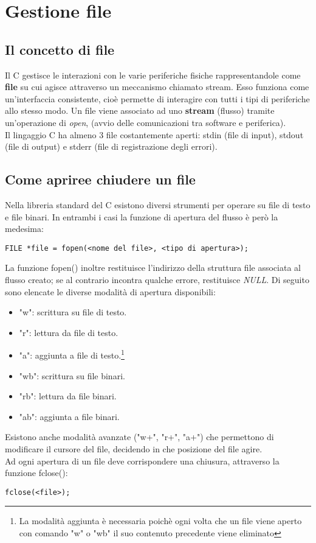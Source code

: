 \chapter{Gestione file}
\section{Il concetto di file}
Il C gestisce le interazioni con le varie periferiche fisiche rappresentandole come \textbf{file} su cui agisce attraverso un meccanismo chiamato stream. Esso funziona come un'interfaccia consistente, cioè permette di interagire con tutti i tipi di periferiche allo stesso modo. Un file viene associato ad uno \textbf{stream} (flusso) tramite un'operazione di \textit{open}, (avvio delle comunicazioni tra software e periferica).\\
Il lingaggio C ha almeno 3 file costantemente aperti: \colorbox{light-gray}{stdin} (file di input), \colorbox{light-gray}{stdout} (file di output) e \colorbox{light-gray}{stderr} (file di registrazione degli errori).

\section{Come apriree chiudere un file}
Nella libreria standard del C esistono diversi strumenti per operare su file di testo e file binari. In entrambi i casi la funzione di apertura del flusso è però la medesima:
\begin{lstlisting}[title={Interfaccia funzione open()}]
FILE *file = fopen(<nome del file>, <tipo di apertura>);
\end{lstlisting}
La funzione \colorbox{light-gray}{fopen()} inoltre restituisce l'indirizzo della struttura file associata al flusso creato; se al contrario incontra qualche errore, restituisce \textit{NULL}.
Di seguito sono elencate le diverse modalità di apertura disponibili:
\begin{itemize}[noitemsep]
	\item \colorbox{light-gray}{"w"}: scrittura su file di testo.
	\item \colorbox{light-gray}{"r"}: lettura da file di testo.
	\item \colorbox{light-gray}{"a"}: aggiunta a file di testo.\footnote[1]{La modalità aggiunta è necessaria poichè ogni volta che un file viene aperto con comando "w" o "wb" il suo contenuto precedente viene eliminato}
	\item \colorbox{light-gray}{"wb"}: scrittura su file binari.
	\item \colorbox{light-gray}{"rb"}: lettura da file binari.
	\item \colorbox{light-gray}{"ab"}: aggiunta a file binari.
\end{itemize}
Esistono anche modalità avanzate (\colorbox{light-gray}{"w+"}, \colorbox{light-gray}{"r+"}, \colorbox{light-gray}{"a+"}) che permettono di modificare il cursore del file, decidendo in che posizione del file agire.\\
Ad ogni apertura di un file deve corrispondere una chiusura, attraverso la funzione \colorbox{light-gray}{fclose()}:
\begin{lstlisting}[title={Interfaccia funzione close()}]
fclose(<file>);
\end{lstlisting}
